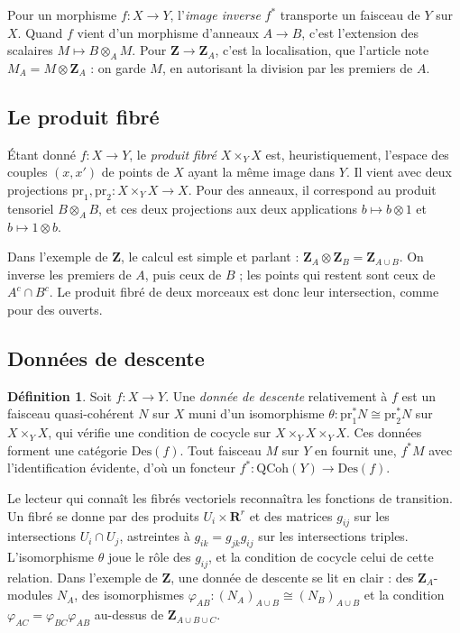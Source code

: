\documentclass[11pt,a4paper]{amsart}
\theoremstyle{definition}
\newtheorem{definition}{Définition}
\theoremstyle{plain}
\theoremstyle{remark}
\newcommand{\Z}{\mathbf Z}
\newcommand{\QCoh}{\mathrm{QCoh}}
\newcommand{\Des}{\mathrm{Des}}
\newcommand{\pr}{\mathrm{pr}}
\begin{document}
Pour un morphisme $f\colon X\to Y$, l'\emph{image inverse} $f^*$ transporte un faisceau de $Y$ sur $X$. Quand $f$ vient d'un morphisme d'anneaux $A\to B$, c'est l'extension des scalaires $M\mapsto B\otimes_AM$. Pour $\Z\to\Z_A$, c'est la localisation, que l'article note $M_A=M\otimes\Z_A$ : on garde $M$, en autorisant la division par les premiers de $A$.

\subsection{Le produit fibré}

Étant donné $f\colon X\to Y$, le \emph{produit fibré} $X\times_YX$ est, heuristiquement, l'espace des couples $(x,x')$ de points de $X$ ayant la même image dans $Y$. Il vient avec deux projections $\pr_1,\pr_2\colon X\times_YX\to X$. Pour des anneaux, il correspond au produit tensoriel $B\otimes_AB$, et ces deux projections aux deux applications $b\mapsto b\otimes1$ et $b\mapsto1\otimes b$.

Dans l'exemple de $\Z$, le calcul est simple et parlant : $\Z_A\otimes\Z_B=\Z_{A\cup B}$. On inverse les premiers de $A$, puis ceux de $B$ ; les points qui restent sont ceux de $A^c\cap B^c$. Le produit fibré de deux morceaux est donc leur intersection, comme pour des ouverts.

\subsection{Données de descente}

\begin{definition}
Soit $f\colon X\to Y$. Une \emph{donnée de descente} relativement à $f$ est un faisceau quasi-cohérent $N$ sur $X$ muni d'un isomorphisme $\theta\colon\pr_1^*N\cong\pr_2^*N$ sur $X\times_YX$, qui vérifie une condition de cocycle sur $X\times_YX\times_YX$. Ces données forment une catégorie $\Des(f)$. Tout faisceau $M$ sur $Y$ en fournit une, $f^*M$ avec l'identification évidente, d'où un foncteur $f^*\colon\QCoh(Y)\to\Des(f)$.
\end{definition}

Le lecteur qui connaît les fibrés vectoriels reconnaîtra les fonctions de transition. Un fibré se donne par des produits $U_i\times\mathbf R^r$ et des matrices $g_{ij}$ sur les intersections $U_i\cap U_j$, astreintes à $g_{ik}=g_{jk}g_{ij}$ sur les intersections triples. L'isomorphisme $\theta$ joue le rôle des $g_{ij}$, et la condition de cocycle celui de cette relation. Dans l'exemple de $\Z$, une donnée de descente se lit en clair : des $\Z_A$-modules $N_A$, des isomorphismes $\varphi_{AB}\colon(N_A)_{A\cup B}\cong(N_B)_{A\cup B}$ et la condition $\varphi_{AC}=\varphi_{BC}\varphi_{AB}$ au-dessus de $\Z_{A\cup B\cup C}$.
\end{document}
